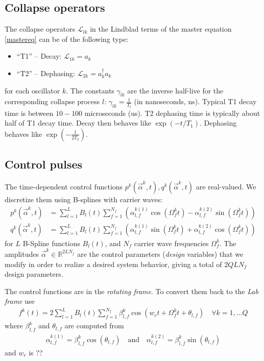 \documentclass[letterpaper]{article}
\newcommand{\Ell}{\mathcal{L}}
\newcommand{\R}{\mathds{R}}
\begin{document}
\subsection{Collapse operators}
The collapse operators $\Ell_{lk}$ in the Lindblad terms of the master equation \eqref{mastereq} can be of the following type:
\begin{itemize}
  \item ``T1'' -- Decay: $\Ell_{1k} = a_k$
  \item ``T2'' -- Dephasing: $\Ell_{2k} = a_k^{\dagger}a_k$
\end{itemize}
for each oscillator $k$. The constants $\gamma_{lk}$ are the inverse half-live for the corresponding collapse process $l$: $\gamma_{lk} = {\frac{1}{T_l}}$ (in nanoseconds, ns). Typical T1 decay time is between $10-100$ microseconds (us). T2 dephasing time is typically about half of T1 decay time. Decay then behaves like $\exp(-t/{T_1})$. Dephasing behaves like $\exp(-\frac{1}{2{T_2}})$.

\subsection{Control pulses}
The time-dependent control functions $p^k(\vec{\alpha}^k,t), q^k(\vec{\alpha}^k,t)$ are real-valued. We discretize them using B-splines with carrier waves:
\begin{align}
  p^k(\vec{\alpha}^k,t) &= \sum_{l=1}^L B_l(t) \sum_{f=1}^{N_f} \left(\alpha^{k (1)}_{l,f} \cos(\Omega_f^k t) - \alpha^{k (2)}_{l,f} \sin(\Omega_f^k t) \right) \\
  q^k(\vec{\alpha}^k,t) &= \sum_{l=1}^L B_l(t) \sum_{f=1}^{N_f} \left( \alpha^{k (1)}_{l,f} \sin(\Omega_f^k t) + \alpha^{k (2)}_{l,f} \cos(\Omega_f^k t) \right)
\end{align}
for $L$ B-Spline functions $B_l(t)$, and $N_f$ carrier wave frequencies $\Omega_f^k$. The amplitudes $\vec{\alpha}^k \in \R^{2LN_f}$ are the control parameters (\textit{design} variables) that we modify in order to realize a desired system behavior, giving a total of $2QLN_f$ design parameters.

The control functions are in the \textit{rotating frame}. To convert them back to the \textit{Lab frame} use
\begin{align}
  f^k(t) = 2 \sum_{l=1}^L B_l(t) \sum_{f=1}^{N_f} \beta_{l,f}^k \cos(w_r t + \Omega_f^k t + \theta_{l,f}) \quad \forall k=1,\dots Q
\end{align}
where $\beta_{l,f}^k$ and $\theta_{l,f}$ are computed from
\begin{align}
  \alpha_{l,f}^{k(1)} = \beta_{l,f}^k \cos(\theta_{l,f}) \quad \text{and} \quad \alpha_{l,f}^{k(2)} = \beta_{l,f}^k \sin(\theta_{l,f})
\end{align}
and $w_r$ is ??
\end{document}
